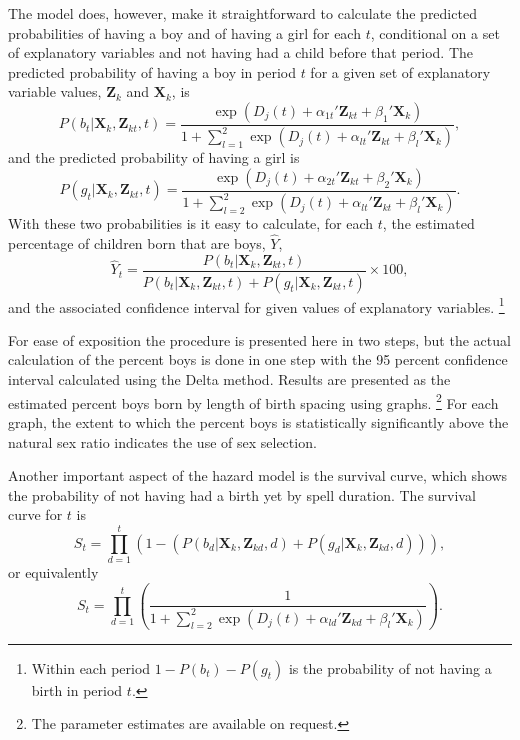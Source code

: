 \documentclass[12pt,letterpaper]{article}
\begin{document}
The model does, however, make it straightforward to calculate the 
predicted probabilities of having a boy and of having a girl for each $t$, conditional
on a set of explanatory variables and not having had a child before that period.
The predicted probability of having a boy in period $t$ for a given set of explanatory
variable values, $\mathbf{Z}_k$ and $\mathbf{X}_k$, is
\begin{equation}
P(b_{t} | \mathbf{X}_{k}, \mathbf{Z}_{kt}, t ) 
=  
\frac{ \exp(D_j(t) + \alpha_{1t}' \mathbf{Z}_{kt} + \beta_1' \mathbf{X}_{k} )}
{1 + \sum_{l=1}^2 \exp(D_j(t) + \alpha_{lt} ' \mathbf{Z}_{kt} + \beta_l ' \mathbf{X}_{k})},
\label{eq:probability_boy}
\end{equation}
and the predicted probability of having a girl is
\begin{equation}
P(g_{t} | \mathbf{X}_{k}, \mathbf{Z}_{kt},t ) 
=  
\frac{ \exp(D_j(t) + \alpha_{2t}'\mathbf{Z}_{kt} + \beta_2'\mathbf{X}_{k} )}
{1 + \sum_{l=2}^2 \exp(D_j(t) + \alpha_{lt}'\mathbf{Z}_{kt} + \beta_l'\mathbf{X}_{k})}.
\label{eq:probability_girl}
\end{equation}
With these two probabilities is it easy to calculate, for each $t$, the estimated
percentage of children born that are boys, $\hat{Y}$, 
\begin{equation}
\hat{Y}_t 
= 
\frac{ P(b_{t} | \mathbf{X}_{k}, \mathbf{Z}_{kt},t )}
{ P(b_{t} | \mathbf{X}_{k}, \mathbf{Z}_{kt},t) + P(g_{t} | \mathbf{X}_{k}, \mathbf{Z}_{kt},t )} 
\times 100,
\label{eq:probability_son}
\end{equation}
and the associated confidence interval for given values of explanatory variables.%
\footnote{
Within each period $1-P(b_{t})-P(g_{t})$ is the probability of not having a birth in 
period $t$.
}

For ease of exposition the procedure is presented here in two steps, but the actual
calculation of the percent boys is done in one step with the 95 percent confidence interval 
calculated using the Delta method.
Results are presented as the estimated percent boys born by length of birth spacing
using graphs.%
\footnote{
The parameter estimates are available on request.
}
For each graph, the extent to which the percent boys is statistically 
significantly above the natural sex ratio indicates the use of sex selection.

Another important aspect of the hazard model is the survival curve, which shows the 
probability of not having had a birth yet by spell duration.
The survival curve for $t$ is 
\begin{equation}
S_{t} 
= 
\prod_{d=1}^t 
\left( 
	1- \left(P(b_{d} | \mathbf{X}_{k}, \mathbf{Z}_{kd}, d) 
	+ P(g_{d} | \mathbf{X}_{k}, \mathbf{Z}_{kd}, d) \right) 
\right),
 \label{eq:survival}
\end{equation}
or equivalently
\begin{equation}
S_{t} 
= 
\prod_{d=1}^t
\left(
\frac{ 1 }
{1 + \sum_{l=2}^2 \exp(D_j(t) + \alpha_{ld}'\mathbf{Z}_{kd} + \beta_l'\mathbf{X}_{k})}
\right).
\end{equation}
\end{document}
